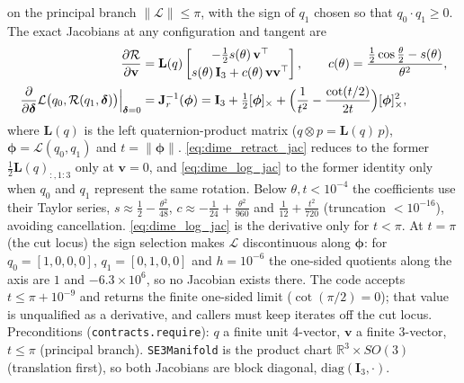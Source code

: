 \documentclass[11pt,a4paper]{article}
\newcommand{\R}{\mathbb{R}}
\newcommand{\bv}{\mathbf{v}}
\newcommand{\bJ}{\mathbf{J}}
\begin{document}
\begin{itemize}[nosep]
    on the principal branch $\lVert\mathcal{L}\rVert\le\pi$, with the sign of
    $q_1$ chosen so that $q_0\cdot q_1\ge 0$.  The exact Jacobians at any
    configuration and tangent are
    \begin{align}
      \frac{\partial\mathcal{R}}{\partial\bv}
        &= \mathbf{L}(q)\begin{bmatrix}-\tfrac12 s(\theta)\,\bv^{\top}\\[2pt]
           s(\theta)\,\mathbf{I}_3+c(\theta)\,\bv\bv^{\top}\end{bmatrix},
        \qquad c(\theta)=\frac{\tfrac12\cos\tfrac{\theta}{2}-s(\theta)}{\theta^{2}},
        \label{eq:dime_retract_jac}\\
      \frac{\partial}{\partial\boldsymbol{\delta}}
        \mathcal{L}\bigl(q_0,\mathcal{R}(q_1,\boldsymbol{\delta})\bigr)\Big|_{\boldsymbol{\delta}=0}
        &= \bJ_r^{-1}(\boldsymbol{\phi})
         = \mathbf{I}_3+\tfrac12[\boldsymbol{\phi}]_\times
           +\Bigl(\frac{1}{t^{2}}-\frac{\cot(t/2)}{2t}\Bigr)[\boldsymbol{\phi}]_\times^{2},
        \label{eq:dime_log_jac}
    \end{align}
    where $\mathbf{L}(q)$ is the left quaternion-product matrix
    ($q\otimes p=\mathbf{L}(q)\,p$), $\boldsymbol{\phi}=\mathcal{L}(q_0,q_1)$ and
    $t=\lVert\boldsymbol{\phi}\rVert$.  \eqref{eq:dime_retract_jac} reduces to the
    former $\tfrac12\mathbf{L}(q)_{:,1:3}$ only at $\bv=0$, and
    \eqref{eq:dime_log_jac} to the former identity only when $q_0$ and $q_1$
    represent the same rotation.  Below $\theta,t<10^{-4}$ the coefficients
    use their Taylor series, $s\approx\tfrac12-\tfrac{\theta^2}{48}$,
    $c\approx-\tfrac1{24}+\tfrac{\theta^2}{960}$ and
    $\tfrac1{12}+\tfrac{t^2}{720}$ (truncation $<10^{-16}$), avoiding
    cancellation.  \eqref{eq:dime_log_jac} is the derivative only for
    $t<\pi$.  At $t=\pi$ (the cut locus) the sign selection makes
    $\mathcal{L}$ discontinuous along $\boldsymbol{\phi}$: for $q_0=[1,0,0,0]$,
    $q_1=[0,1,0,0]$ and $h=10^{-6}$ the one-sided quotients along the axis
    are $1$ and $-6.3\times10^{6}$, so no Jacobian exists there.  The code
    accepts $t\le\pi+10^{-9}$ and returns the finite one-sided limit
    ($\cot(\pi/2)=0$); that value is unqualified as a derivative, and callers
    must keep iterates off the cut locus.  Preconditions
    (\texttt{contracts.require}): $q$ a finite unit 4-vector, $\bv$ a finite
    3-vector, $t\le\pi$ (principal branch).  \texttt{SE3Manifold}
    is the product chart $\R^3\times SO(3)$ (translation first), so both
    Jacobians are block diagonal, $\mathrm{diag}(\mathbf{I}_3,\cdot)$.

\end{itemize}
\end{document}
